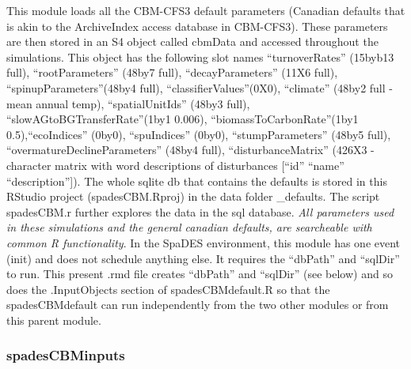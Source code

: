 \documentclass[]{article}
\begin{document}
This module loads all the CBM-CFS3 default parameters (Canadian defaults
that is akin to the ArchiveIndex access database in CBM-CFS3). These
parameters are then stored in an S4 object called cbmData and accessed
throughout the simulations. This object has the following slot names
``turnoverRates'' (15byb13 full), ``rootParameters'' (48by7 full),
``decayParameters'' (11X6 full), ``spinupParameters''(48by4 full),
``classifierValues''(0X0), ``climate'' (48by2 full - mean annual temp),
``spatialUnitIds'' (48by3 full), ``slowAGtoBGTransferRate''(1by1 0.006),
``biomassToCarbonRate''(1by1 0.5),``ecoIndices'' (0by0), ``spuIndices''
(0by0), ``stumpParameters'' (48by5 full),
``overmatureDeclineParameters'' (48by4 full), ``disturbanceMatrix''
(426X3 - character matrix with word descriptions of disturbances
{[}``id'' ``name'' ``description''{]}). The whole sqlite db that
contains the defaults is stored in this RStudio project
(spadesCBM.Rproj) in the data folder \spadesCBM\data\cbm\_defaults. The
script spadesCBM\exploringCode\readInSQLiteData.r further explores the
data in the sql database. \emph{All parameters used in these simulations
and the general canadian defaults, are searcheable with common R
functionality}. In the SpaDES environment, this module has one event
(init) and does not schedule anything else. It requires the ``dbPath''
and ``sqlDir'' to run. This present .rmd file creates ``dbPath'' and
``sqlDir'' (see below) and so does the .InputObjects section of
spadesCBMdefault.R so that the spadesCBMdefault can run independently
from the two other modules or from this parent module.

\subsubsection{spadesCBMinputs}\label{spadescbminputs}
\end{document}
